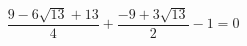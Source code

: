 \documentclass[preview]{standalone}
\begin{document}
\begin{align*}
\dfrac{9 - 6\sqrt{13} + 13 }{4}  + \dfrac{-9 + 3\sqrt{13} }{2}  -1 = 0
\end{align*}
\end{document}
